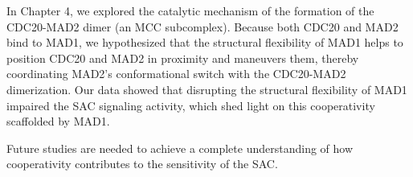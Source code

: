 In Chapter 4, we explored the catalytic mechanism of the formation of the CDC20-MAD2 dimer (an MCC subcomplex). Because both CDC20 and MAD2 bind to MAD1, we hypothesized that the structural flexibility of MAD1 helps to position CDC20 and MAD2 in proximity and maneuvers them, thereby coordinating MAD2's conformational switch with the CDC20-MAD2 dimerization. Our data showed that disrupting the structural flexibility of MAD1 impaired the SAC signaling activity, which shed light on this cooperativity scaffolded by MAD1.

Future studies are needed to achieve a complete understanding of how cooperativity contributes to the sensitivity of the SAC.